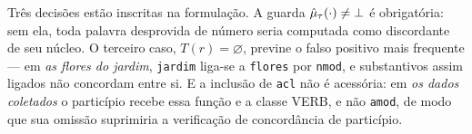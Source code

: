 Três decisões estão inscritas na formulação. A guarda $\hat\mu_{\tau}(\cdot) \neq \bot$ é
obrigatória: sem ela, toda palavra desprovida de número seria computada como discordante de
seu núcleo. O terceiro caso, $T(r) = \varnothing$, previne o falso positivo mais frequente ---
em \emph{as flores do jardim}, \texttt{jardim} liga-se a \texttt{flores} por \texttt{nmod}, e
substantivos assim ligados não concordam entre si. E a inclusão de \texttt{acl} não é
acessória: em \emph{os dados coletados} o particípio recebe essa função e a classe VERB, e não
\texttt{amod}, de modo que sua omissão suprimiria a verificação de concordância de particípio.
